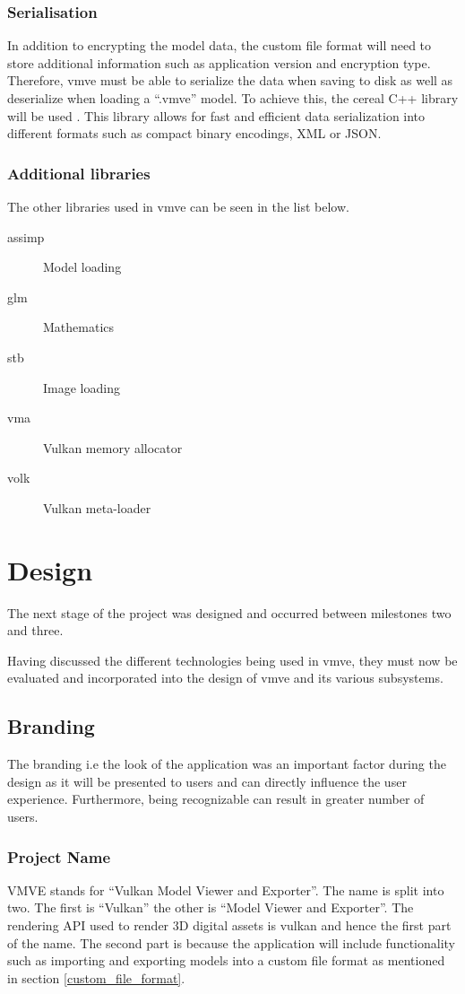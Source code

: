 \documentclass[11pt]{article}
\begin{document}
\subsubsection{Serialisation}
In addition to encrypting the model data, the custom file format will need to
store additional information such as application version and encryption type.
Therefore, \gls{vmve} must be able to serialize the data when saving to disk as
well as deserialize when loading a ``.vmve'' model. To achieve this, the cereal
C++ library will be used \cite{cereal}. This library allows for fast and
efficient data serialization into different formats such as compact binary
encodings, XML or JSON.

\subsubsection{Additional libraries}
The other libraries used in \gls{vmve} can be seen in the list below.
\begin{description}
  \item[assimp] Model loading
  \item[glm] Mathematics
  \item[stb] Image loading
  \item[vma] Vulkan memory allocator
  \item[volk] Vulkan meta-loader
\end{description}

\section{Design}
The next stage of the project was designed and occurred between milestones two
and three. 

Having discussed the different technologies being used in \gls{vmve}, they must
now be evaluated and incorporated into the design of \gls{vmve} and its various
subsystems.

\subsection{Branding}
The branding i.e the look of the application was an important factor during the
design as it will be presented to users and can directly influence the user
experience. Furthermore, being recognizable can result in greater number of
users.

\subsubsection{Project Name}
VMVE stands for ``Vulkan Model Viewer and Exporter''. The name is split into
two. The first is ``Vulkan'' the other is ``Model Viewer and Exporter''. The
rendering API used to render 3D digital assets is \gls{vulkan} and hence the
first part of the name. The second part is because the application will include
functionality such as importing and exporting models into a custom file format
as mentioned in section \ref{custom_file_format}.
\end{document}
